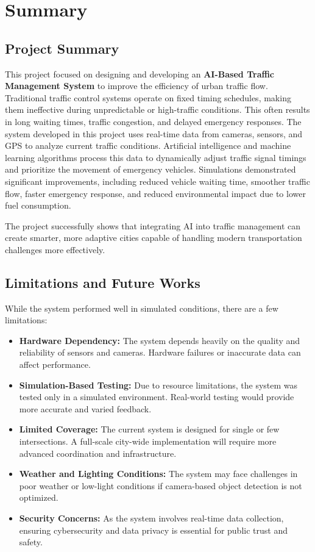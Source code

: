 \chapter{Summary}

\section{Project Summary}

This project focused on designing and developing an \textbf{AI-Based Traffic Management System} to improve the efficiency of urban traffic flow. Traditional traffic control systems operate on fixed timing schedules, making them ineffective during unpredictable or high-traffic conditions. This often results in long waiting times, traffic congestion, and delayed emergency responses. The system developed in this project uses real-time data from cameras, sensors, and GPS to analyze current traffic conditions. Artificial intelligence and machine learning algorithms process this data to dynamically adjust traffic signal timings and prioritize the movement of emergency vehicles. Simulations demonstrated significant improvements, including reduced vehicle waiting time, smoother traffic flow, faster emergency response, and reduced environmental impact due to lower fuel consumption.

The project successfully shows that integrating AI into traffic management can create smarter, more adaptive cities capable of handling modern transportation challenges more effectively.

\section{Limitations and Future Works}

While the system performed well in simulated conditions, there are a few limitations:

\begin{itemize}
    \item \textbf{Hardware Dependency:} The system depends heavily on the quality and reliability of sensors and cameras. Hardware failures or inaccurate data can affect performance.
    \item \textbf{Simulation-Based Testing:} Due to resource limitations, the system was tested only in a simulated environment. Real-world testing would provide more accurate and varied feedback.
    \item \textbf{Limited Coverage:} The current system is designed for single or few intersections. A full-scale city-wide implementation will require more advanced coordination and infrastructure.
    \item \textbf{Weather and Lighting Conditions:} The system may face challenges in poor weather or low-light conditions if camera-based object detection is not optimized.
    \item \textbf{Security Concerns:} As the system involves real-time data collection, ensuring cybersecurity and data privacy is essential for public trust and safety.
\end{itemize}

